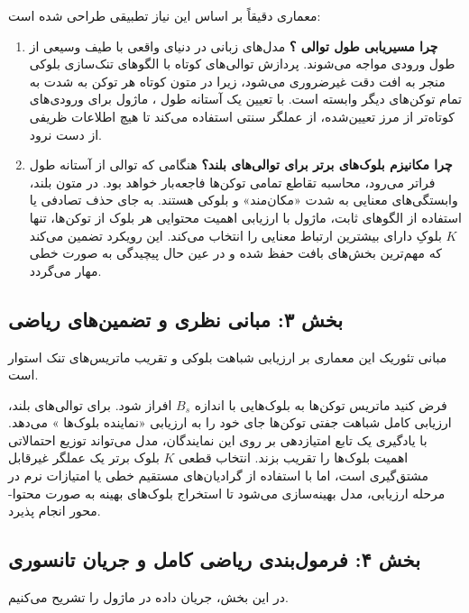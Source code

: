 معماری  دقیقاً بر اساس این نیاز تطبیقی طراحی شده است:

\begin{enumerate}
    \item \textbf{چرا مسیریابی طول توالی ؟}
    مدل‌های زبانی در دنیای واقعی با طیف وسیعی از طول ورودی مواجه می‌شوند. پردازش توالی‌های کوتاه با الگوهای تنک‌سازی بلوکی منجر به افت دقت غیرضروری می‌شود، زیرا در متون کوتاه هر توکن به شدت به تمام توکن‌های دیگر وابسته است. با تعیین یک آستانه طول ، ماژول برای ورودی‌های کوتاه‌تر از مرز تعیین‌شده، از عملگر سنتی  استفاده می‌کند تا هیچ اطلاعات ظریفی از دست نرود.

    \item \textbf{چرا مکانیزم بلوک‌های برتر  برای توالی‌های بلند؟}
    هنگامی که توالی از آستانه طول فراتر می‌رود، محاسبه تقاطع تمامی توکن‌ها فاجعه‌بار خواهد بود. در متون بلند، وابستگی‌های معنایی به شدت «مکان‌مند» و بلوکی هستند. به جای حذف تصادفی یا استفاده از الگوهای ثابت، ماژول  با ارزیابی اهمیت محتوایی هر بلوک از توکن‌ها، تنها $K$ بلوکِ دارای بیشترین ارتباط معنایی را انتخاب می‌کند. این رویکرد تضمین می‌کند که مهم‌ترین بخش‌های بافت حفظ شده و در عین حال پیچیدگی به صورت خطی مهار می‌گردد.
\end{enumerate}

\subsection*{بخش ۳: مبانی نظری و تضمین‌های ریاضی }
مبانی تئوریک این معماری بر ارزیابی شباهت بلوکی  و تقریب ماتریس‌های تنک استوار است.

فرض کنید ماتریس توکن‌ها به بلوک‌هایی با اندازه $B_s$ افراز شود. برای توالی‌های بلند، ارزیابی کامل شباهت جفتی توکن‌ها جای خود را به ارزیابی «نماینده بلوک‌ها » می‌دهد. با یادگیری یک تابع امتیازدهی بر روی این نمایندگان، مدل می‌تواند توزیع احتمالاتی اهمیت بلوک‌ها را تقریب بزند. انتخاب قطعی $K$ بلوک برتر  یک عملگر غیرقابل مشتق‌گیری است، اما با استفاده از گرادیان‌های مستقیم خطی یا امتیازات نرم در مرحله ارزیابی، مدل بهینه‌سازی می‌شود تا استخراج بلوک‌های بهینه به صورت محتوا-محور انجام پذیرد.

\subsection*{بخش ۴: فرمول‌بندی ریاضی کامل و جریان تانسوری }
در این بخش، جریان داده در ماژول  را تشریح می‌کنیم. 

